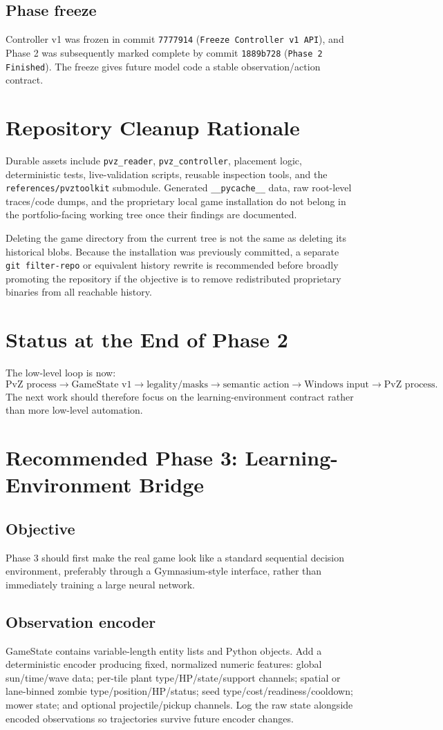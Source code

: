 \documentclass[11pt,a4paper]{article}
\begin{document}
\subsection{Phase freeze}
Controller v1 was frozen in commit \texttt{7777914} (\texttt{Freeze Controller v1 API}), and Phase 2 was subsequently marked complete by commit \texttt{1889b728} (\texttt{Phase 2 Finished}). The freeze gives future model code a stable observation/action contract.
\section{Repository Cleanup Rationale}
Durable assets include \texttt{pvz\_reader}, \texttt{pvz\_controller}, placement logic, deterministic tests, live-validation scripts, reusable inspection tools, and the \texttt{references/pvztoolkit} submodule. Generated \texttt{\_\_pycache\_\_} data, raw root-level traces/code dumps, and the proprietary local game installation do not belong in the portfolio-facing working tree once their findings are documented.

Deleting the game directory from the current tree is not the same as deleting its historical blobs. Because the installation was previously committed, a separate \texttt{git filter-repo} or equivalent history rewrite is recommended before broadly promoting the repository if the objective is to remove redistributed proprietary binaries from all reachable history.
\section{Status at the End of Phase 2}
The low-level loop is now:
\[
\text{PvZ process}\rightarrow\text{GameState v1}\rightarrow\text{legality/masks}\rightarrow\text{semantic action}\rightarrow\text{Windows input}\rightarrow\text{PvZ process}.
\]
The next work should therefore focus on the learning-environment contract rather than more low-level automation.
\section{Recommended Phase 3: Learning-Environment Bridge}
\subsection{Objective}
Phase 3 should first make the real game look like a standard sequential decision environment, preferably through a Gymnasium-style interface, rather than immediately training a large neural network.
\subsection{Observation encoder}
GameState contains variable-length entity lists and Python objects. Add a deterministic encoder producing fixed, normalized numeric features: global sun/time/wave data; per-tile plant type/HP/state/support channels; spatial or lane-binned zombie type/position/HP/status; seed type/cost/readiness/cooldown; mower state; and optional projectile/pickup channels. Log the raw state alongside encoded observations so trajectories survive future encoder changes.
\end{document}

